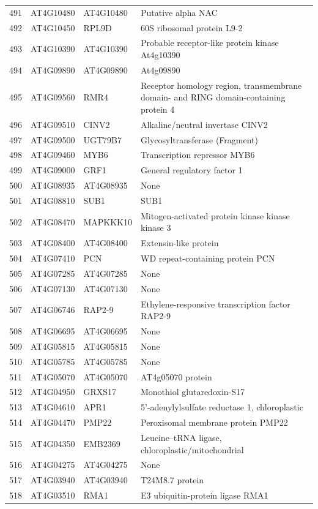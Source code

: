 \documentclass[11pt]{article}
\begin{document}
\begin{center}
\begin{tabular}{rlll}
491 & AT4G10480 & AT4G10480 & Putative alpha NAC\\
492 & AT4G10450 & RPL9D & 60S ribosomal protein L9-2\\
493 & AT4G10390 & AT4G10390 & Probable receptor-like protein kinase At4g10390\\
494 & AT4G09890 & AT4G09890 & At4g09890\\
495 & AT4G09560 & RMR4 & Receptor homology region, transmembrane domain- and RING domain-containing protein 4\\
496 & AT4G09510 & CINV2 & Alkaline/neutral invertase CINV2\\
497 & AT4G09500 & UGT79B7 & Glycosyltransferase (Fragment)\\
498 & AT4G09460 & MYB6 & Transcription repressor MYB6\\
499 & AT4G09000 & GRF1 & General regulatory factor 1\\
500 & AT4G08935 & AT4G08935 & None\\
501 & AT4G08810 & SUB1 & SUB1\\
502 & AT4G08470 & MAPKKK10 & Mitogen-activated protein kinase kinase kinase 3\\
503 & AT4G08400 & AT4G08400 & Extensin-like protein\\
504 & AT4G07410 & PCN & WD repeat-containing protein PCN\\
505 & AT4G07285 & AT4G07285 & None\\
506 & AT4G07130 & AT4G07130 & None\\
507 & AT4G06746 & RAP2-9 & Ethylene-responsive transcription factor RAP2-9\\
508 & AT4G06695 & AT4G06695 & None\\
509 & AT4G05815 & AT4G05815 & None\\
510 & AT4G05785 & AT4G05785 & None\\
511 & AT4G05070 & AT4G05070 & AT4g05070 protein\\
512 & AT4G04950 & GRXS17 & Monothiol glutaredoxin-S17\\
513 & AT4G04610 & APR1 & 5'-adenylylsulfate reductase 1, chloroplastic\\
514 & AT4G04470 & PMP22 & Peroxisomal membrane protein PMP22\\
515 & AT4G04350 & EMB2369 & Leucine--tRNA ligase, chloroplastic/mitochondrial\\
516 & AT4G04275 & AT4G04275 & None\\
517 & AT4G03940 & AT4G03940 & T24M8.7 protein\\
518 & AT4G03510 & RMA1 & E3 ubiquitin-protein ligase RMA1\\

\end{tabular}
\end{center}
\end{document}
